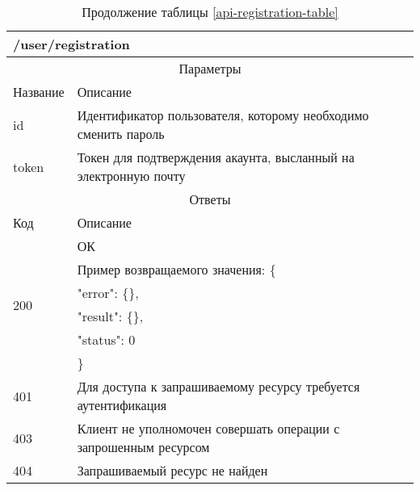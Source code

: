 \begin{table}[H]
  \caption*{Продолжение таблицы \ref{api-registration-table}}
  \begin{tabular}{|p{6cm}|p{10cm}|}
  \hline \multicolumn{2}{|l|}{/user/registration} \\
  \hline \multicolumn{2}{|c|}{Параметры} \\
  \hline Название & Описание \\
  \hline id & Идентификатор пользователя, которому необходимо сменить пароль \\
  \hline token & Токен для подтверждения акаунта, высланный на электронную почту \\
  \hline \multicolumn{2}{|c|}{Ответы} \\
  \hline Код & Описание \\
  \hline \multirow{6}{=}{200} & ОК \\
   & Пример возвращаемого значения: \{ \\
   & "error": \{\}, \\
   & "result": \{\}, \\
   & "status": 0 \\
   & \} \\
  \hline 401 & Для доступа к запрашиваемому ресурсу требуется аутентификация \\
  \hline 403 & Клиент не уполномочен совершать операции с запрошенным ресурсом \\
  \hline 404 & Запрашиваемый ресурс не найден \\
  \hline
  \end{tabular}
\end{table}
